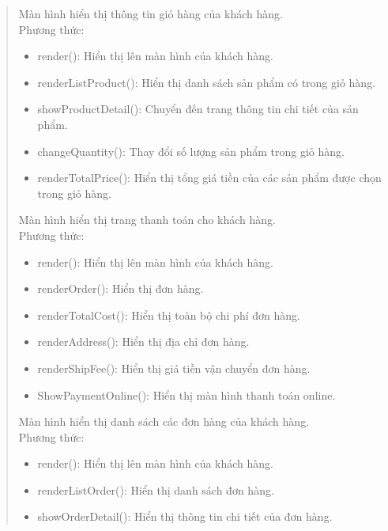 \begin{quote}
    Màn hình hiển thị thông tin giỏ hàng của khách hàng.\\
    Phương thức:
    \begin{itemize}
        \item render(): Hiển thị lên màn hình của khách hàng.
        \item renderListProduct(): Hiển thị danh sách sản phẩm có trong giỏ hàng.
        \item showProductDetail(): Chuyển đến trang thông tin chi tiết của sản phẩm.
        \item changeQuantity(): Thay đổi số lượng sản phẩm trong giỏ hàng.
        \item renderTotalPrice(): Hiển thị tổng giá tiền của các sản phẩm được chọn trong giỏ hàng.
    \end{itemize}
   
    Màn hình hiển thị trang thanh toán cho khách hàng.\\
    Phương thức:
    \begin{itemize}
        \item render(): Hiển thị lên màn hình của khách hàng.
        \item renderOrder(): Hiển thị đơn hàng.
        \item renderTotalCost(): Hiển thị toàn bộ chi phí đơn hàng.
        \item renderAddress(): Hiển thị địa chỉ đơn hàng.
        \item renderShipFee(): Hiển thị giá tiền vận chuyển đơn hàng.
        \item ShowPaymentOnline(): Hiển thị màn hình thanh toán online.
    \end{itemize}
   
    Màn hình hiển thị danh sách các đơn hàng của khách hàng.\\
    Phương thức:
    \begin{itemize}
        \item render(): Hiển thị lên màn hình của khách hàng.
        \item renderListOrder(): Hiển thị danh sách đơn hàng.
        \item showOrderDetail(): Hiển thị thông tin chi tiết của đơn hàng.
    \end{itemize}
   

\end{quote}
